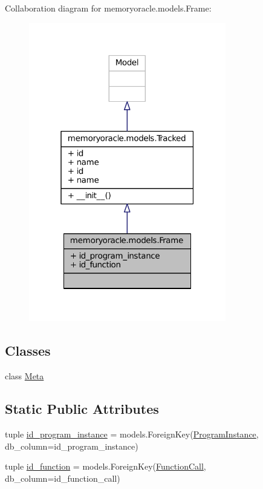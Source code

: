 Collaboration diagram for memoryoracle.\+models.\+Frame\+:
\nopagebreak
\begin{figure}[H]
\begin{center}
\leavevmode
\includegraphics[width=244pt]{classmemoryoracle_1_1models_1_1Frame__coll__graph}
\end{center}
\end{figure}
\subsection*{Classes}
\begin{DoxyCompactItemize}
\item 
class \hyperlink{classmemoryoracle_1_1models_1_1Frame_1_1Meta}{Meta}
\end{DoxyCompactItemize}
\subsection*{Static Public Attributes}
\begin{DoxyCompactItemize}
\item 
tuple \hyperlink{classmemoryoracle_1_1models_1_1Frame_ae4f2ea8ebb8e597c69d3a8aa268bb6f0}{id\+\_\+program\+\_\+instance} = models.\+Foreign\+Key(\textquotesingle{}\hyperlink{classmemoryoracle_1_1models_1_1ProgramInstance}{Program\+Instance}\textquotesingle{}, db\+\_\+column=\textquotesingle{}id\+\_\+program\+\_\+instance\textquotesingle{})
\item 
tuple \hyperlink{classmemoryoracle_1_1models_1_1Frame_a988356e3b82af6fe51f9f953e881d4ef}{id\+\_\+function} = models.\+Foreign\+Key(\textquotesingle{}\hyperlink{classmemoryoracle_1_1models_1_1FunctionCall}{Function\+Call}\textquotesingle{}, db\+\_\+column=\textquotesingle{}id\+\_\+function\+\_\+call\textquotesingle{})
\end{DoxyCompactItemize}
